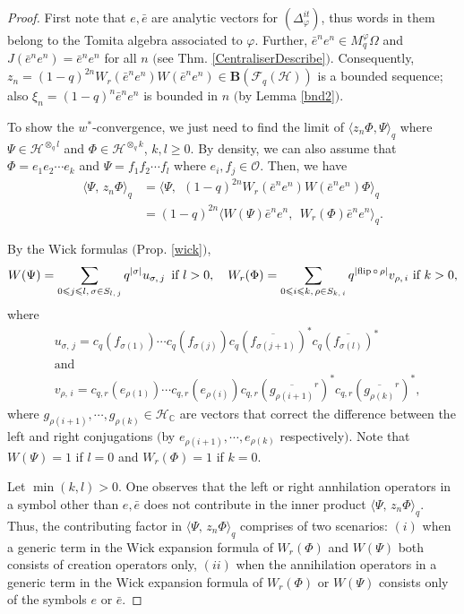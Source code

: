 \documentclass[12pt, a4paper,reqno]{amsart}
\theoremstyle{definition}
\renewcommand{\leq}{\leqslant}
\renewcommand{\geq}{\geqslant}
\def\C{\mathbb C}
\newcommand{\CH}{\mathcal{H}}
\begin{document}
\begin{proof}
First note that $e, \bar e$ are analytic vectors for $(\Delta^{it}_\varphi)$, thus words in them belong to the Tomita algebra associated to $\varphi$. Further, $\bar{e}^{ n}e^{ n}\in M_q^\varphi\Omega$ and $J(\bar{e}^ne^n)=\bar{e}^ne^n$ for all $n$ $($see Thm. \ref{CentraliserDescribe}$)$. Consequently, $z_n=(1-q)^{2n} W_r(\bar{e}^{ n}e^{ n}) W(\bar{e}^{ n} e^{  n})\in \mathbf{B}(\mathcal{F}_q(\mathcal{H}))$ is a bounded sequence; also $\xi_n=(1-q)^{n}  \bar{e}^n e^n$ is bounded in $n$ $($by Lemma \ref{bnd2}$)$.

To show the $w^*$-convergence, we just need to find the limit of $\langle z_n \Phi, \Psi \rangle_q$ where $ \Psi \in \CH^{\otimes_q l}$ and $ \Phi \in \CH^{\otimes_q k}$, $k,l\geq 0$.  By density, we can also assume  that $\Phi =e_1 e_2 \cdots e_k$ and $\Psi=f_1 f_2 \cdots  f_l$ where $ e_i, f_j\in \mathcal{O}$. Then, we  have 
\begin{align*}
\langle \Psi,\,z_n \Phi \rangle_q  &= \langle \Psi,~~(1-q)^{2n}	W_r(\bar{e}^n e^n) W(\bar{e}^n e^n)   \Phi  \rangle_q \\	
&= (1-q)^{2n} \langle W(\Psi) \bar{e}^n e^n,~~W_r(\Phi) \bar{e}^n e^n \rangle_q.
\end{align*}	 

By the Wick formulas $($Prop. \ref{wick}$)$,  
$$W(\Psi)=\sum_{ 0\leq j\leq l,\,\sigma\in S_{l,\,j} } q^{| \sigma|}u_{\sigma,\,j}\,\text{ if }l>0, \quad
W_r(\Phi)=\sum_{ 0\leq i\leq k,\, \rho\in S_{k,\,i}} q^{|{\rm flip}\,\circ\,\rho|}v_{\rho,\,i}\text{ if }k>0, $$
where
\begin{align*} &u_{\sigma,\,j}=c_q(f_{\sigma(1)})\cdots c_q({f_{\sigma(j)}})c_q(\overline{f_{\sigma(j+1)}})^*c_q(\overline{f_{\sigma(l)}})^* \\
&\textrm{and }\\
&v_{\rho,\,i}=c_{q,r}(e_{\rho(1)})\cdots  c_{q,r}({e_{\rho(i)}})c_{q,r}(
\overline{g_{\rho(i+1)}}^r)^*c_{q,r}(\overline{g_{\rho(k)}}^r)^*,
\end{align*}
where $g_{\rho(i+1)}, \cdots, g_{\rho(k)}\in \CH_\C$ are vectors that correct the difference between the left and right conjugations $($by $e_{\rho(i+1)}, \cdots, e_{\rho(k)}$ respectively$)$. Note that $W(\Psi)=1$ if $l=0$ and $W_r(\Phi)=1$ if $k=0$.

Let $\min(k,l)>0$. One observes that the left or right annhilation operators in a symbol other  than $e,\bar e$ does not contribute in the inner product $\langle \Psi,\,z_n \Phi\rangle_q$. Thus, the contributing factor in $\langle \Psi,\,z_n \Phi \rangle_q$ comprises of two scenarios: $(i)$ when a generic term in the Wick expansion formula of $W_r(\Phi)$ and $W(\Psi)$ both consists of creation operators only, $(ii)$ when the annihilation operators in a generic term in the Wick expansion formula of $W_r(\Phi)$ or $W(\Psi)$ consists only of the symbols $e$ or $\bar e$. 


\end{proof}
\end{document}

